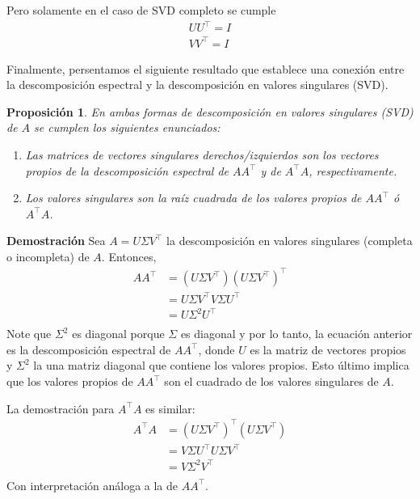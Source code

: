 \documentclass{article}
\numberwithin{equation}{section}
\newtheorem{proposition}{Proposición}
\theoremstyle{remark}
\theoremstyle{definition}
\theoremstyle{remark}
\theoremstyle{remark}
\begin{document}
Pero solamente en el caso de SVD completo se cumple 
\begin{align*}
    U U^\intercal = I \\
    V V^\intercal = I 
\end{align*}

Finalmente, persentamos el siguiente resultado que establece una conexión entre la descomposición
espectral y la descomposición en valores singulares (SVD).

\begin{proposition}
    \label{pp:eigen_svd}
    En ambas formas de descomposición en valores singulares (SVD) de $A$ se cumplen los siguientes
    enunciados:
    \begin{enumerate}[I]
        \item Las matrices de vectores singulares derechos/izquierdos son los vectores propios
        de la descomposición espectral de $A A^\intercal$ y de $A^\intercal A$, respectivamente.
        \item Los valores singulares son la raíz cuadrada de los valores propios de 
        $A A^\intercal$ ó $A^\intercal A$.
    \end{enumerate}
\end{proposition}

\textbf{Demostración}
Sea $A = U \Sigma V^\intercal$ la descomposición en valores singulares (completa o incompleta) de $A$.
Entonces, 
\begin{align*}
    A A^\intercal &= (U \Sigma V^\intercal)(U \Sigma V^\intercal)^\intercal \\
        &= U \Sigma V^\intercal V \Sigma U^\intercal \\
        &= U \Sigma^2 U^\intercal \\
\end{align*}
Note que $\Sigma^2$ es diagonal porque $\Sigma$ es diagonal y por lo tanto, la ecuación anterior
es la descomposición espectral de $A A^\intercal$, donde $U$ es la matriz de vectores propios y
$\Sigma^2$ la una matriz diagonal que contiene los valores propios. Esto último implica que los 
valores propios de $A A^\intercal$ son el cuadrado de los valores singulares de $A$.

La demostración para $A^\intercal A$ es similar:
\begin{align*}
    A^\intercal A &= (U \Sigma V^\intercal)^\intercal (U \Sigma V^\intercal)\\
        &= V \Sigma U^\intercal U \Sigma V^\intercal \\
        &= V \Sigma^2 V^\intercal \\
\end{align*}
Con interpretación análoga a la de $A A^\intercal$.
\end{document}

